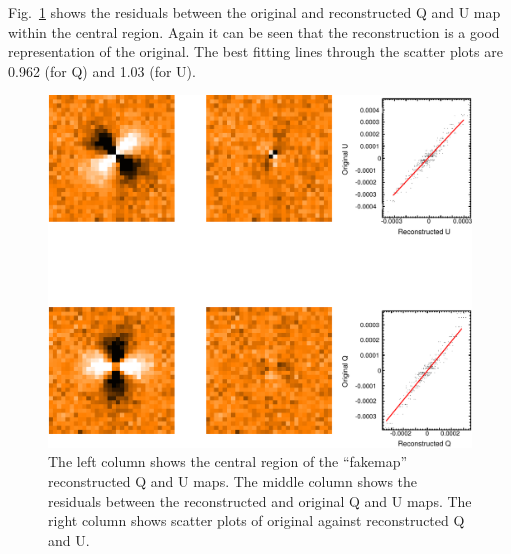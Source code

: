 \documentclass[twoside,11pt]{starlink}
\begin{document}
Fig.~\ref{fig:recon2b} shows the residuals between the original and
reconstructed Q and U map within the central region. Again it can be seen
that the reconstruction is a good representation of the original. The best
fitting lines through the scatter plots are 0.962 (for Q) and 1.03
(for U).

\begin{figure}
\includegraphics[width=\columnwidth]{recon2b}
\caption{The left column shows the central region of the ``fakemap''
reconstructed Q and U maps. The middle column shows the residuals between
the reconstructed and original Q and U maps. The right column shows
scatter plots of original against reconstructed Q and U. }
\label{fig:recon2b}
\end{figure}
\end{document}
